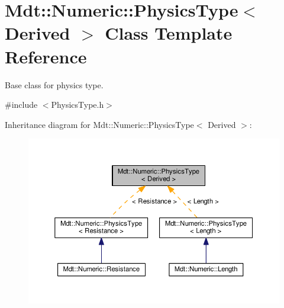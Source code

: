 \hypertarget{class_mdt_1_1_numeric_1_1_physics_type}{}\section{Mdt\+:\+:Numeric\+:\+:Physics\+Type$<$ Derived $>$ Class Template Reference}
\label{class_mdt_1_1_numeric_1_1_physics_type}


Base class for physics type.  




{\ttfamily \#include $<$Physics\+Type.\+h$>$}



Inheritance diagram for Mdt\+:\+:Numeric\+:\+:Physics\+Type$<$ Derived $>$\+:\nopagebreak
\begin{figure}[H]
\begin{center}
\leavevmode
\includegraphics[width=350pt]{class_mdt_1_1_numeric_1_1_physics_type__inherit__graph}
\end{center}
\end{figure}
